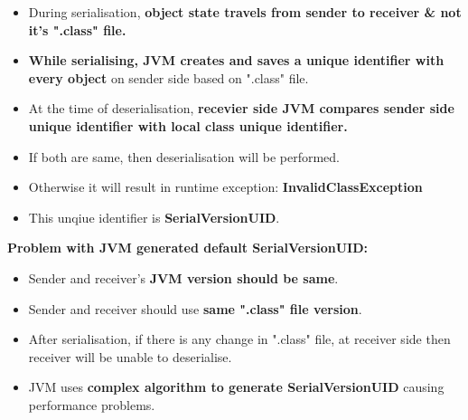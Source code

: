 \setlength{\columnsep}{3pt}
\begin{flushleft}
	\begin{itemize}
		\item During serialisation, \textbf{object state travels from sender to receiver \& not it's ".class" file.}
		\item \textbf{While serialising, JVM creates and saves a unique identifier with every object} on sender side based on ".class" file.
		\item At the time of deserialisation, \textbf{recevier side JVM compares sender side unique identifier with local class unique identifier. }
		\item If both are same, then deserialisation will be performed. 
		\item Otherwise it will result in runtime exception: \textbf{InvalidClassException}
		\item This unqiue identifier is \textbf{SerialVersionUID}.
	\end{itemize}	
	\newpage
	\textbf{Problem with JVM generated default SerialVersionUID:}
	\begin{itemize}
		\item Sender and receiver's \textbf{JVM version should be same}.
		\item Sender and receiver should use \textbf{same ".class" file version}. 
		\item After serialisation, if there is any change in ".class" file, at receiver side then receiver will be unable to deserialise.
		\item JVM uses \textbf{complex algorithm to generate SerialVersionUID} causing performance problems.
	\end{itemize}
\end{flushleft}

